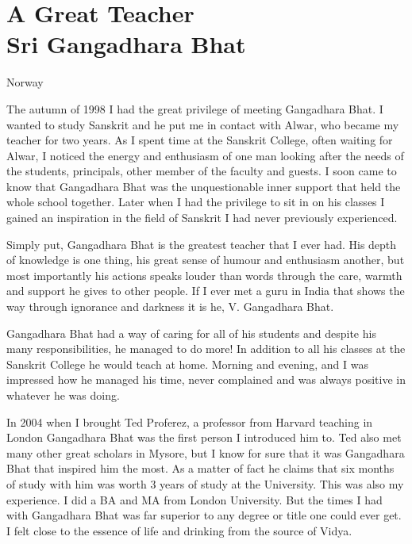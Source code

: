 \chapter{A Great Teacher \\Sri Gangadhara Bhat}

\begin{center}

\smallskip

Norway
\addrule
\end{center}

The autumn of 1998 I had the great privilege of meeting Gangadhara Bhat. I wanted to study Sanskrit and he put me in contact with Alwar, who became my teacher for two years. As I spent time at the Sanskrit College, often waiting for Alwar, I noticed the energy and enthusiasm of one man looking after the needs of the students, principals, other member of the faculty and guests. I soon came to know that Gangadhara Bhat was the unquestionable inner support that held the whole school together. Later when I had the privilege to sit in on his classes I gained an inspiration in the field of Sanskrit I had never previously experienced.

Simply put, Gangadhara Bhat is the greatest teacher that I ever had. His depth of knowledge is one thing, his great sense of humour and enthusiasm another, but most importantly his actions speaks louder than words through the care, warmth and support he gives to other people. If I ever met a guru in India that shows the way through ignorance and darkness it is he, V. Gangadhara Bhat.

Gangadhara Bhat had a way of caring for all of his students and despite his many responsibilities, he managed to do more! In addition to all his classes at the Sanskrit College he would teach at home. Morning and evening, and I was impressed how he managed his time, never complained and was always positive in whatever he was doing.

In 2004 when I brought Ted Proferez, a professor from Harvard teaching in London Gangadhara Bhat was the first person I introduced him to. Ted also met many other great scholars in Mysore, but I know for sure that it was Gangadhara Bhat that inspired him the most. As a matter of fact he claims that six months of study with him was worth 3 years of study at the University. This was also my experience. I did a BA and MA from London University. But the times I had with Gangadhara Bhat was far superior to any degree or title one could ever get. I felt close to the essence of life and drinking from the source of Vidya.

